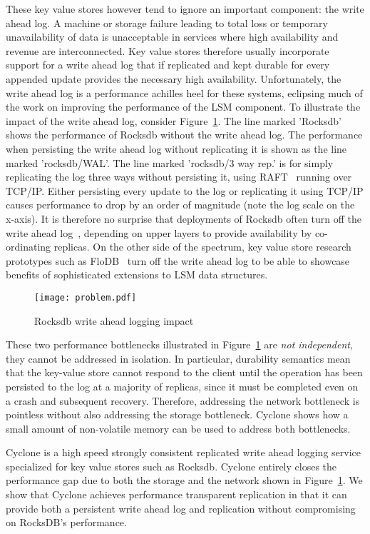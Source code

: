 \documentclass[twocolumn]{article}
\begin{document}
These key value stores however tend to ignore an important component: the write
ahead log. A machine or storage failure leading to total loss or temporary
unavailability of data is unacceptable in services where high availability and
revenue are interconnected. Key value stores therefore usually incorporate
support for a write ahead log that if replicated and kept durable for every
appended update provides the necessary high availability. Unfortunately, the
write ahead log is a performance achilles heel for these systems, eclipsing much
of the work on improving the performance of the LSM component. To illustrate the
impact of the write ahead log, consider Figure~\ref{fig:problem}. The line
marked 'Rocksdb' shows the performance of Rocksdb without the write ahead
log. The performance when persisting the write ahead log without replicating it
is shown as the line marked 'rocksdb/WAL'. The line marked 'rocksdb/3 way rep.'
is for simply replicating the log three ways without persisting it, using
RAFT~\cite{raft} running over TCP/IP. Either persisting every update to the log
or replicating it using TCP/IP causes performance to drop by an order of
magnitude (note the log scale on the x-axis). It is therefore no surprise that
deployments of Rocksdb often turn off the write ahead log~\cite{samza},
depending on upper layers to provide availability by co-ordinating replicas. On
the other side of the spectrum, key value store research prototypes such as
FloDB~\cite{flodb} turn off the write ahead log to be able to showcase benefits
of sophisticated extensions to LSM data structures.


\begin{figure}
\centering \texttt{[image: problem.pdf]}
\caption{Rocksdb write ahead logging impact}
\label{fig:problem}
\end{figure}

These two performance bottlenecks illustrated in Figure~\ref{fig:problem} are
\emph{not independent}, they cannot be addressed in isolation. In particular,
durability semantics mean that the key-value store cannot respond to the client
until the operation has been persisted to the log at a majority of replicas,
since it must be completed even on a crash and subsequent recovery. Therefore,
addressing the network bottleneck is pointless without also addressing the
storage bottleneck. Cyclone shows how a small amount of non-volatile memory can
be used to address both bottlenecks.

Cyclone is a high speed strongly consistent replicated write ahead logging
service specialized for key value stores such as Rocksdb. Cyclone entirely
closes the performance gap due to both the storage and the network shown in
Figure~\ref{fig:problem}. We show that Cyclone achieves performance transparent
replication in that it can provide both a persistent write ahead log and
replication without compromising on RocksDB's performance.
\end{document}
